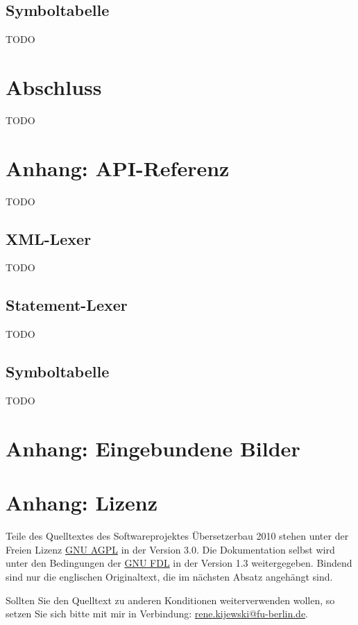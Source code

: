 \documentclass[10pt,a4paper,ngerman,titlepage,tocindentauto]{article}
\begin{document}
		\subsection{Symboltabelle}
			TODO
	
	\section{Abschluss}
		TODO
	
	\newpage
	\section{Anhang: API-Referenz}
		TODO
	
		\subsection[XML-Lexer]{\hypertarget{XML-Lexer-API}{XML-Lexer}}
			TODO
	
		\subsection{Statement-Lexer}
			TODO
	
		\subsection{Symboltabelle}
			TODO
	
	\section{Anhang: Eingebundene Bilder}
		\listoffigures
	
	\section{Anhang: Lizenz}
		Teile des Quelltextes des Softwareprojektes Übersetzerbau 2010 stehen unter der Freien
		Lizenz \href{http://www.gnu.org/licenses/agpl-3.0.html}{GNU AGPL} in der Version 3.0.
		Die Dokumentation selbst wird unter den Bedingungen der \href{http://www.gnu.org/licenses/fdl-1.3.html}{GNU FDL}
		in der Version 1.3 weitergegeben.
		Bindend sind nur die englischen Originaltext, die im nächsten Absatz angehängt sind.
		
		Sollten Sie den Quelltext zu anderen Konditionen weiterverwenden wollen, so setzen Sie
		sich bitte mit mir in Verbindung:
		\href{mailto:rene.kijewski@fu-berlin.de?subject=[SWP_CP_2010]}{rene.kijewski@fu-berlin.de}.
		
\end{document}
